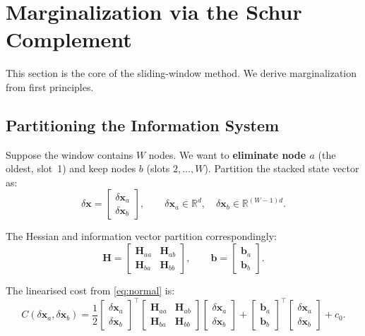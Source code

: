 \documentclass[11pt,a4paper]{article}
\newcommand{\bx}{\bm{x}}
\newcommand{\bb}{\bm{b}}
\newcommand{\bH}{\bm{H}}
\newcommand{\R}{\mathbb{R}}
\theoremstyle{definition}
\theoremstyle{plain}
\begin{document}
\section{Marginalization via the Schur Complement}
\label{sec:marginalization}

This section is the core of the sliding-window method.  We derive
marginalization from first principles.

\subsection{Partitioning the Information System}

Suppose the window contains $W$ nodes.  We want to \textbf{eliminate node $a$}
(the oldest, slot~1) and keep nodes $b$ (slots $2, \ldots, W$).
Partition the stacked state vector as:
\begin{equation}
  \delta\bx = \begin{bmatrix} \delta\bx_a \\ \delta\bx_b \end{bmatrix},
  \qquad
  \delta\bx_a \in \R^{d}, \quad
  \delta\bx_b \in \R^{(W-1)d}.
\end{equation}

The Hessian and information vector partition correspondingly:
\begin{equation}
  \bH = \begin{bmatrix}
    \bH_{aa} & \bH_{ab} \\
    \bH_{ba} & \bH_{bb}
  \end{bmatrix}, \qquad
  \bb = \begin{bmatrix} \bb_a \\ \bb_b \end{bmatrix}.
  \label{eq:partition}
\end{equation}

The linearised cost from \eqref{eq:normal} is:
\begin{equation}
  C(\delta\bx_a, \delta\bx_b) =
    \frac{1}{2}
    \begin{bmatrix} \delta\bx_a \\ \delta\bx_b \end{bmatrix}^\top
    \begin{bmatrix} \bH_{aa} & \bH_{ab} \\ \bH_{ba} & \bH_{bb} \end{bmatrix}
    \begin{bmatrix} \delta\bx_a \\ \delta\bx_b \end{bmatrix}
    + \begin{bmatrix} \bb_a \\ \bb_b \end{bmatrix}^\top
    \begin{bmatrix} \delta\bx_a \\ \delta\bx_b \end{bmatrix}
    + c_0.
  \label{eq:quadratic_cost}
\end{equation}
\end{document}

